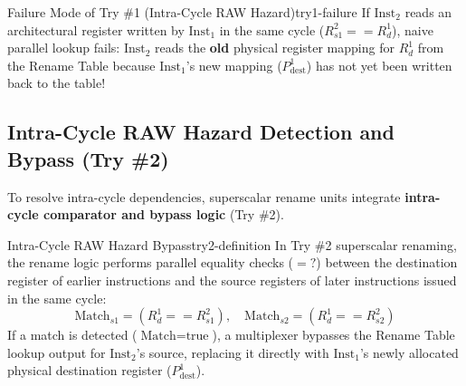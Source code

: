 \begin{observation}{Failure Mode of Try \#1 (Intra-Cycle RAW Hazard)}{try1-failure}
If $\text{Inst}_2$ reads an architectural register written by $\text{Inst}_1$ in the same cycle ($R_{s1}^2 == R_d^1$), naive parallel lookup fails: $\text{Inst}_2$ reads the \textbf{old} physical register mapping for $R_d^1$ from the Rename Table because $\text{Inst}_1$'s new mapping ($P_{\text{dest}}^1$) has not yet been written back to the table!
\end{observation}

\subsection{Intra-Cycle RAW Hazard Detection and Bypass (Try \#2)}

To resolve intra-cycle dependencies, superscalar rename units integrate \textbf{intra-cycle comparator and bypass logic} (Try \#2).

\begin{definition}{Intra-Cycle RAW Hazard Bypass}{try2-definition}
In Try \#2 superscalar renaming, the rename logic performs parallel equality checks ($=?$) between the destination register of earlier instructions and the source registers of later instructions issued in the same cycle:
\begin{equation}
\text{Match}_{s1} = (R_d^1 == R_{s1}^2), \quad \text{Match}_{s2} = (R_d^1 == R_{s2}^2)
\end{equation}
If a match is detected ($\text{Match} = \text{true}$), a multiplexer bypasses the Rename Table lookup output for $\text{Inst}_2$'s source, replacing it directly with $\text{Inst}_1$'s newly allocated physical destination register ($P_{\text{dest}}^1$).
\end{definition}

